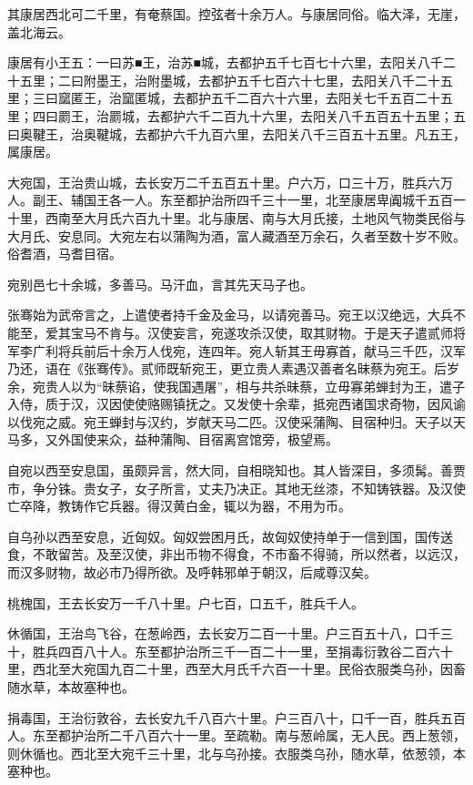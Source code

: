 \documentclass[]{article}
\begin{document}
其康居西北可二千里，有奄蔡国。控弦者十余万人。与康居同俗。临大泽，无崖，盖北海云。

康居有小王五：一曰苏■王，治苏■城，去都护五千七百七十六里，去阳关八千二十五里；二曰附墨王，治附墨城，去都护五千七百六十七里，去阳关八千二十五里；三曰窳匿王，治窳匿城，去都护五千二百六十六里，去阳关七千五百二十五里；四曰罽王，治罽城，去都护六千二百九十六里，去阳关八千五百五十五里；五曰奥鞬王，治奥鞬城，去都护六千九百六里，去阳关八千三百五十五里。凡五王，属康居。

大宛国，王治贵山城，去长安万二千五百五十里。户六万，口三十万，胜兵六万人。副王、辅国王各一人。东至都护治所四千三十一里，北至康居卑阗城千五百一十里，西南至大月氏六百九十里。北与康居、南与大月氏接，土地风气物类民俗与大月氏、安息同。大宛左右以蒲陶为酒，富人藏酒至万余石，久者至数十岁不败。俗耆酒，马耆目宿。

宛别邑七十余城，多善马。马汗血，言其先天马子也。

张骞始为武帝言之，上遣使者持千金及金马，以请宛善马。宛王以汉绝远，大兵不能至，爱其宝马不肯与。汉使妄言，宛遂攻杀汉使，取其财物。于是天子遣贰师将军李广利将兵前后十余万人伐宛，连四年。宛人斩其王毋寡首，献马三千匹，汉军乃还，语在《张骞传》。贰师既斩宛王，更立贵人素遇汉善者名昧蔡为宛王。后岁余，宛贵人以为``昧蔡谄，使我国遇屠''，相与共杀昧蔡，立毋寡弟蝉封为王，遣子入侍，质于汉，汉因使使赂赐镇抚之。又发使十余辈，抵宛西诸国求奇物，因风谕以伐宛之威。宛王蝉封与汉约，岁献天马二匹。汉使采蒲陶、目宿种归。天子以天马多，又外国使来众，益种蒲陶、目宿离宫馆旁，极望焉。

自宛以西至安息国，虽颇异言，然大同，自相晓知也。其人皆深目，多须髯。善贾市，争分铢。贵女子，女子所言，丈夫乃决正。其地无丝漆，不知铸铁器。及汉使亡卒降，教铸作它兵器。得汉黄白金，辄以为器，不用为币。

自乌孙以西至安息，近匈奴。匈奴尝困月氏，故匈奴使持单于一信到国，国传送食，不敢留苦。及至汉使，非出币物不得食，不市畜不得骑，所以然者，以远汉，而汉多财物，故必市乃得所欲。及呼韩邪单于朝汉，后咸尊汉矣。

桃槐国，王去长安万一千八十里。户七百，口五千，胜兵千人。

休循国，王治鸟飞谷，在葱岭西，去长安万二百一十里。户三百五十八，口千三十，胜兵四百八十人。东至都护治所三千一百二十一里，至捐毒衍敦谷二百六十里，西北至大宛国九百二十里，西至大月氏千六百一十里。民俗衣服类乌孙，因畜随水草，本故塞种也。

捐毒国，王治衍敦谷，去长安九千八百六十里。户三百八十，口千一百，胜兵五百人。东至都护治所二千八百六十一里。至疏勒。南与葱岭属，无人民。西上葱领，则休循也。西北至大宛千三十里，北与乌孙接。衣服类乌孙，随水草，依葱领，本塞种也。
\end{document}
